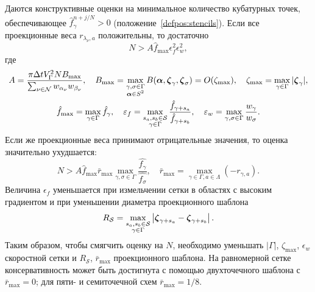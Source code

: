 Даются конструктивные оценки на минимальное количество кубатурных точек,
обеспечивающее \(\hat{f}_\gamma^{n+j/N}>0\) (положение~\ref{defpos:stencils}).
Если все проекционные веса \(r_{\lambda_\nu,a}\) положительны, то достаточно
\begin{equation*}
    N > A \hat{f}_{\max} \epsilon_f^2 \epsilon_w^2,
\end{equation*}
где
\begin{gather*}
    A = \frac{\pi\Delta{t} V_\Gamma^2 N B_{\max}}{\sum_{\nu\in\mathcal{N}} w_{\alpha_\nu}w_{\beta_\nu}}, \quad
    B_{\max} = \max_{\substack{\gamma,\sigma\in\Gamma\\\boldsymbol{\alpha}\in S^2}}
        B(\boldsymbol{\alpha}, {\boldsymbol{\zeta}}_{\gamma}, {\boldsymbol{\zeta}}_{\sigma}) = O(\zeta_{\max}), \quad
    \zeta_{\max} = \max_{\gamma\in\Gamma}|{\boldsymbol{\zeta}}_\gamma|, \\
    \hat{f}_{\max} = \max_{\gamma\in\Gamma} \hat{f}_\gamma, \quad
    \varepsilon_f = \max_{\substack{s_a,s_b\in\mathcal{S}\\\gamma\in\Gamma}} \frac{\hat{f}_{\gamma+s_a}}{\hat{f}_{\gamma+s_b}}, \quad
    \varepsilon_w = \max_{\gamma,\sigma\in\Gamma} \frac{w_\gamma}{w_\sigma}.
\end{gather*}
Если же проекционные веса принимают отрицательные значения, то оценка значительно ухудшается:
\begin{equation*}
    N > A \hat{f}_{\max} \bar{r}_{\max} \max_{\gamma,\sigma\in\Gamma}\frac{\hat{f_\gamma}}{\hat{f_\sigma}}, \quad
    \bar{r}_{\max} = \max_{\gamma\in\Gamma,a\in\Lambda}( -r_{\gamma,a} ).
\end{equation*}
Величина \(\epsilon_f\) уменьшается при измельчении сетки в областях с высоким градиентом
и при уменьшении диаметра проекционного шаблона
\begin{equation*}
    R_\mathcal{S} = \max_{\substack{s_a,s_b\in\mathcal{S}\\\gamma\in\Gamma}}
        \left| {\boldsymbol{\zeta}}_{\gamma+s_a} - {\boldsymbol{\zeta}}_{\gamma+s_b} \right|.
\end{equation*}
Таким образом, чтобы смягчить оценку на \(N\),
необходимо уменьшать \(|\Gamma|\), \(\zeta_{\max}\), \(\epsilon_w\) скоростной сетки
и \(R_\mathcal{S}\), \(\bar{r}_{\max}\) проекционного шаблона.
На равномерной сетке консервативность может быть достигнута с помощью двухточечного шаблона с \(\bar{r}_{\max}=0\);
для пяти- и семиточечной схем \(\bar{r}_{\max}=1/8\).

